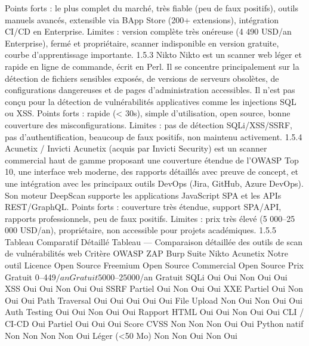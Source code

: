 Points forts : le plus complet du marché, très fiable (peu de faux positifs), outils manuels avancés, extensible via BApp Store (200+ extensions), intégration CI/CD en Enterprise.
Limites : version complète très onéreuse (4 490 USD/an Enterprise), fermé et propriétaire, scanner indisponible en version gratuite, courbe d'apprentissage importante.
1.5.3  Nikto
Nikto est un scanner web léger et rapide en ligne de commande, écrit en Perl. Il se concentre principalement sur la détection de fichiers sensibles exposés, de versions de serveurs obsolètes, de configurations dangereuses et de pages d'administration accessibles. Il n'est pas conçu pour la détection de vulnérabilités applicatives comme les injections SQL ou XSS.
Points forts : rapide (< 30s), simple d'utilisation, open source, bonne couverture des misconfigurations.
Limites : pas de détection SQLi/XSS/SSRF, pas d'authentification, beaucoup de faux positifs, non maintenu activement.
1.5.4  Acunetix / Invicti
Acunetix (acquis par Invicti Security) est un scanner commercial haut de gamme proposant une couverture étendue de l'OWASP Top 10, une interface web moderne, des rapports détaillés avec preuve de concept, et une intégration avec les principaux outils DevOps (Jira, GitHub, Azure DevOps). Son moteur DeepScan supporte les applications JavaScript SPA et les APIs REST/GraphQL.
Points forts : couverture très étendue, support SPA/API, rapports professionnels, peu de faux positifs.
Limites : prix très élevé (5 000–25 000 USD/an), propriétaire, non accessible pour projets académiques.
1.5.5  Tableau Comparatif Détaillé
Tableau — Comparaison détaillée des outils de scan de vulnérabilités web
Critère	OWASP ZAP	Burp Suite	Nikto	Acunetix	Notre outil
Licence	Open Source	Freemium	Open Source	Commercial	Open Source
Prix	Gratuit	0–449$/an	Gratuit	5000–25000$/an	Gratuit
SQLi	Oui	Oui	Non	Oui	Oui
XSS	Oui	Oui	Non	Oui	Oui
SSRF	Partiel	Oui	Non	Oui	Oui
XXE	Partiel	Oui	Non	Oui	Oui
Path Traversal	Oui	Oui	Oui	Oui	Oui
File Upload	Non	Oui	Non	Oui	Oui
Auth Testing	Oui	Oui	Non	Oui	Oui
Rapport HTML	Oui	Oui	Non	Oui	Oui
CLI / CI-CD	Oui	Partiel	Oui	Oui	Oui
Score CVSS	Non	Non	Non	Oui	Oui
Python natif	Non	Non	Non	Non	Oui
Léger (<50 Mo)	Non	Non	Oui	Non	Oui

